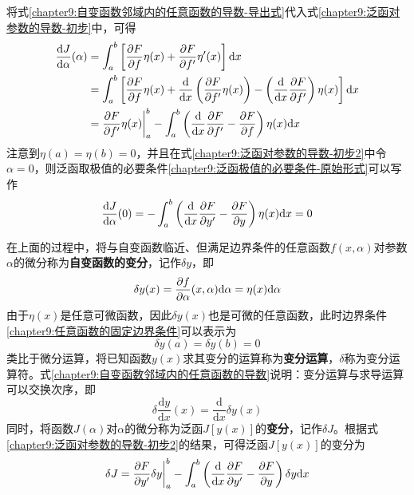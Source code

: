 将式\eqref{chapter9:自变函数邻域内的任意函数的导数-导出式}代入式\eqref{chapter9:泛函对参数的导数-初步}中，可得
\begin{align}
	\dfrac{\mathrm{d} J}{\mathrm{d} \alpha}(\alpha) & = \int_a^b \left[\frac{\partial F}{\partial f}\eta(x)+\frac{\partial F}{\partial f'}\eta'(x)\right]\mathrm{d} x \nonumber\\
	& = \int_a^b \left[\frac{\partial F}{\partial f}\eta(x)+\dfrac{\mathrm{d}}{\mathrm{d} x}\left(\frac{\partial F}{\partial f'}\eta(x)\right)-\left(\dfrac{\mathrm{d}}{\mathrm{d} x}\frac{\partial F}{\partial f'}\right)\eta(x)\right]\mathrm{d} x \nonumber \\
	& = \frac{\partial F}{\partial f'}\eta(x)\bigg|_a^b - \int_a^b \left(\dfrac{\mathrm{d}}{\mathrm{d} x}\frac{\partial F}{\partial f'}-\frac{\partial F}{\partial f}\right)\eta(x)\mathrm{d} x
	\label{chapter9:泛函对参数的导数-初步2}
\end{align}
注意到$\eta(a)=\eta(b)=0$，并且在式\eqref{chapter9:泛函对参数的导数-初步2}中令$\alpha=0$，则泛函取极值的必要条件\eqref{chapter9:泛函极值的必要条件-原始形式}可以写作
\begin{equation}
	\dfrac{\mathrm{d} J}{\mathrm{d} \alpha}(0)= -\int_a^b \left(\dfrac{\mathrm{d}}{\mathrm{d} x}\frac{\partial F}{\partial y'}-\frac{\partial F}{\partial y}\right)\eta(x)\mathrm{d} x=0
	\label{chapter9:泛函对参数的导数-结果}
\end{equation}

在上面的过程中，将与自变函数临近、但满足边界条件的任意函数$f(x,\alpha)$对参数$\alpha$的微分称为{\bf 自变函数的变分}，记作$\delta y$，即
\begin{equation*}
	\delta y(x) = \frac{\partial f}{\partial \alpha}(x,\alpha)\mathrm{d} \alpha = \eta(x)\mathrm{d} \alpha
\end{equation*}
由于$\eta(x)$是任意可微函数，因此$\delta y(x)$也是可微的任意函数，此时边界条件\eqref{chapter9:任意函数的固定边界条件}可以表示为
\begin{equation}
	\delta y(a)=\delta y(b)=0
	\label{chapter9:自变函数变分的固定边界条件}
\end{equation}
类比于微分运算，将已知函数$y(x)$求其变分的运算称为{\bf 变分运算}，$\delta$称为变分运算符。式\eqref{chapter9:自变函数邻域内的任意函数的导数}说明：变分运算与求导运算可以交换次序，即
\begin{equation}
	\delta \frac{\mathrm{d}y}{\mathrm{d}x}(x) = \frac{\mathrm{d}}{\mathrm{d} x} \delta y(x)
	\label{chapter9:变分运算与求导运算可以交换次序}
\end{equation}
同时，将函数$J(\alpha)$对$\alpha$的微分称为泛函$J[y(x)]$的{\bf 变分}，记作$\delta J$。根据式\eqref{chapter9:泛函对参数的导数-初步2}的结果，可得泛函$J[y(x)]$的变分为
\begin{equation}
	\delta J = \frac{\partial F}{\partial y'}\delta y\bigg|_a^b - \int_a^b \left(\dfrac{\mathrm{d}}{\mathrm{d} x}\frac{\partial F}{\partial y'}-\frac{\partial F}{\partial y}\right)\delta y\mathrm{d} x
\end{equation}

